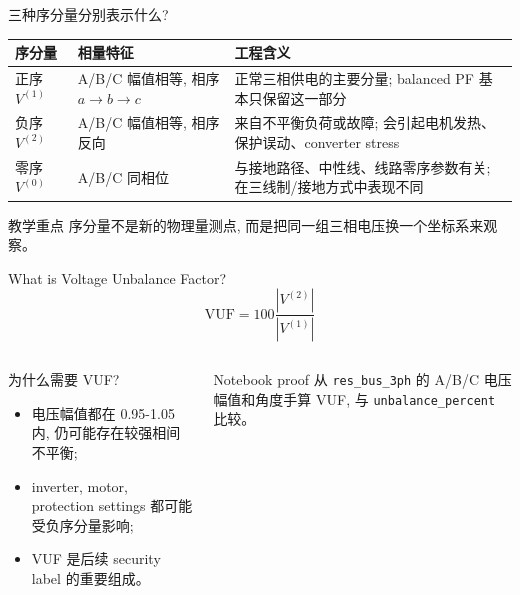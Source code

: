 \documentclass[aspectratio=169,10pt]{ctexbeamer}
\newcommand{\code}[1]{\texttt{#1}}
\begin{document}
\begin{frame}{三种序分量分别表示什么?}
\small
\begin{tabular}{p{}p{}p{}}
\toprule
序分量 & 相量特征 & 工程含义 \\
\midrule
正序 $V^{(1)}$ & A/B/C 幅值相等, 相序 $a\rightarrow b\rightarrow c$ & 正常三相供电的主要分量; balanced PF 基本只保留这一部分 \\
负序 $V^{(2)}$ & A/B/C 幅值相等, 相序反向 & 来自不平衡负荷或故障; 会引起电机发热、保护误动、converter stress \\
零序 $V^{(0)}$ & A/B/C 同相位 & 与接地路径、中性线、线路零序参数有关; 在三线制/接地方式中表现不同 \\
\bottomrule
\end{tabular}
\vspace{0.8em}
\begin{alertblock}{教学重点}
序分量不是新的物理量测点, 而是把同一组三相电压换一个坐标系来观察。
\end{alertblock}
\end{frame}

\begin{frame}{What is Voltage Unbalance Factor?}
\[
\mathrm{VUF}=100\frac{|V^{(2)}|}{|V^{(1)}|}
\]
\vspace{0.5em}
\begin{columns}[T]
\begin{block}{为什么需要 VUF?}
\begin{itemize}
  \item 电压幅值都在 0.95-1.05 内, 仍可能存在较强相间不平衡;
  \item inverter, motor, protection settings 都可能受负序分量影响;
  \item VUF 是后续 security label 的重要组成。
\end{itemize}
\end{block}
\begin{alertblock}{Notebook proof}
从 \code{res\_bus\_3ph} 的 A/B/C 电压幅值和角度手算 VUF, 与 \code{unbalance\_percent} 比较。
\end{alertblock}
\end{columns}
\end{frame}
\end{document}
